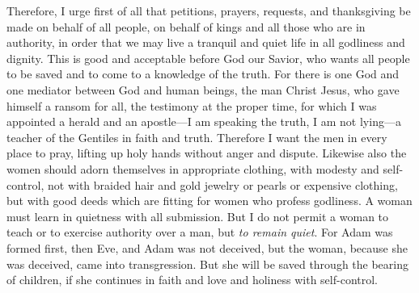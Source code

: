 \begin{biblechapter} %
 Therefore, I urge first of all that petitions, prayers, requests, and thanksgiving be made on behalf of all people,
\verse on behalf of kings and all those who are in authority, in order that we may live a tranquil and quiet life in all godliness and dignity.
\verse This is good and acceptable before God our Savior,
\verse who wants all people to be saved and to come to a knowledge of the truth.
\verse For there is one God and one mediator between God and human beings, the man Christ Jesus,
\verse who gave himself a ransom for all, the testimony at the proper time,
\verse for which I was appointed a herald and an apostle—I am speaking the truth, I am not lying—a teacher of the Gentiles in faith and truth.
\verse Therefore I want the men in every place to pray, lifting up holy hands without anger and dispute.
 Likewise also the women should adorn themselves in appropriate clothing, with modesty and self-control, not with braided hair and gold jewelry or pearls or expensive clothing,
\verse but with good deeds which are fitting for women who profess godliness.
\verse A woman must learn in quietness with all submission.
\verse But I do not permit a woman to teach or to exercise authority over a man, but \textit{to remain quiet}.
\verse For Adam was formed first, then Eve,
\verse and Adam was not deceived, but the woman, because she was deceived, came into transgression.
\verse But she will be saved through the bearing of children, if she continues in faith and love and holiness with self-control.
\end{biblechapter}

